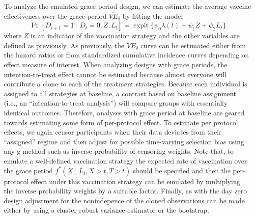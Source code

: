 \begin{appendix}
    To analyze the emulated grace period design, we can estimate the average vaccine effectiveness over the grace period $\overline{VE}_\delta$ by fitting the model 
    $$\Pr[D_{t+1} = 1 \mid D_t = 0, Z, L_t] =  \operatorname{expit}\{\psi_0 \lambda(t) + \psi_1 Z + \psi_2 L_t\}$$
    where $Z$ is an indicator of the vaccination strategy and the other variables are defined as previously. As previously, the $\overline{VE}_\delta$ curve can be estimated either from the hazard ratios or from standardized cumulative incidence curves depending on effect measure of interest. When analyzing designs with grace periods, the intention-to-treat effect cannot be estimated because almost everyone will contribute a clone to each of the treatment strategies. Because each individual is assigned to all strategies at baseline, a contrast based on baseline assignment (i.e., an ``intention-to-treat analysis'') will compare groups with essentially identical outcomes. Therefore, analyses with grace period at baseline are geared towards estimating some form of per-protocol effect. To estimate per protocol effects, we again censor participants when their data deviates from their ``assigned'' regime and then adjust for possible time-varying selection bias using any g-method such as inverse-probability of censoring weights. Note that, to emulate a well-defined vaccination strategy the expected rate of vaccination over the grace period $f^*(X \mid \overline{L}_t, X > t, T > t)$ should be specified and then the per-protocol effect under this vaccination strategy can be emulated by multiplying the inverse probability weights by a suitable factor. Finally, as with the day zero design adjustment for the nonindepence of the cloned observations can be made either by using a cluster-robust variance estimator or the bootstrap. 

    

    

    \newpage 
    \clearpage
    \begin{figure}[p]
    \centering
\end{figure}
\end{appendix}
